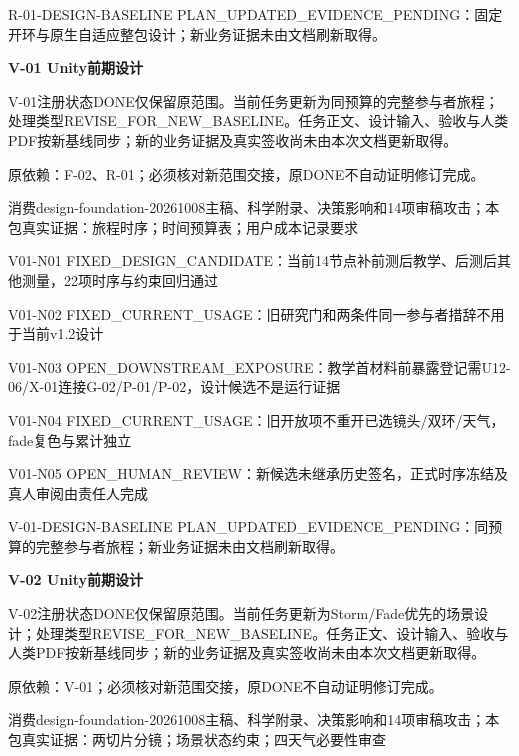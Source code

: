 \documentclass[11pt,a4paper]{article}
\newcommand{\reviewsection}[1]{\par\Needspace{5\baselineskip}\vspace{10pt}\begin{center}{\titlelatin\titlecjk\bfseries\fontsize{14}{20}\selectfont #1}\end{center}}
\begin{document}
R-\allowbreak{}01-\allowbreak{}DESIGN-\allowbreak{}BASELINE PLAN\_\allowbreak{}UPDATED\_\allowbreak{}EVIDENCE\_\allowbreak{}PENDING：固定开环与原生自适应整包设计；新业务证据未由文档刷新取得。


\reviewsection{V-\allowbreak{}01 Unity前期设计}
V-\allowbreak{}01注册状态DONE仅保留原范围。当前任务更新为同预算的完整参与者旅程；处理类型REVISE\_\allowbreak{}FOR\_\allowbreak{}NEW\_\allowbreak{}BASELINE。任务正文、设计输入、验收与人类PDF按新基线同步；新的业务证据及真实签收尚未由本次文档更新取得。


原依赖：F-\allowbreak{}02、R-\allowbreak{}01；必须核对新范围交接，原DONE不自动证明修订完成。


消费design-\allowbreak{}foundation-\allowbreak{}20261008主稿、科学附录、决策影响和14项审稿攻击；本包真实证据：旅程时序；时间预算表；用户成本记录要求


V01-\allowbreak{}N01 FIXED\_\allowbreak{}DESIGN\_\allowbreak{}CANDIDATE：当前14节点补前测后教学、后测后其他测量，22项时序与约束回归通过


V01-\allowbreak{}N02 FIXED\_\allowbreak{}CURRENT\_\allowbreak{}USAGE：旧研究门和两条件同一参与者措辞不用于当前v1.2设计


V01-\allowbreak{}N03 OPEN\_\allowbreak{}DOWNSTREAM\_\allowbreak{}EXPOSURE：教学首材料前暴露登记需U12-\allowbreak{}06/\allowbreak{}X-\allowbreak{}01连接G-\allowbreak{}02/\allowbreak{}P-\allowbreak{}01/\allowbreak{}P-\allowbreak{}02，设计候选不是运行证据


V01-\allowbreak{}N04 FIXED\_\allowbreak{}CURRENT\_\allowbreak{}USAGE：旧开放项不重开已选镜头/\allowbreak{}双环/\allowbreak{}天气，fade复色与累计独立


V01-\allowbreak{}N05 OPEN\_\allowbreak{}HUMAN\_\allowbreak{}REVIEW：新候选未继承历史签名，正式时序冻结及真人审阅由责任人完成


V-\allowbreak{}01-\allowbreak{}DESIGN-\allowbreak{}BASELINE PLAN\_\allowbreak{}UPDATED\_\allowbreak{}EVIDENCE\_\allowbreak{}PENDING：同预算的完整参与者旅程；新业务证据未由文档刷新取得。


\reviewsection{V-\allowbreak{}02 Unity前期设计}
V-\allowbreak{}02注册状态DONE仅保留原范围。当前任务更新为Storm/\allowbreak{}Fade优先的场景设计；处理类型REVISE\_\allowbreak{}FOR\_\allowbreak{}NEW\_\allowbreak{}BASELINE。任务正文、设计输入、验收与人类PDF按新基线同步；新的业务证据及真实签收尚未由本次文档更新取得。


原依赖：V-\allowbreak{}01；必须核对新范围交接，原DONE不自动证明修订完成。


消费design-\allowbreak{}foundation-\allowbreak{}20261008主稿、科学附录、决策影响和14项审稿攻击；本包真实证据：两切片分镜；场景状态约束；四天气必要性审查
\end{document}

